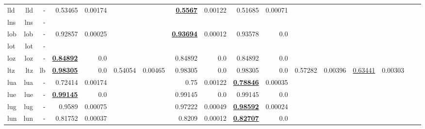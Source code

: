 \documentclass[11pt]{article}
\begin{document}
\begin{table*}[h]
{\begin{tabular}{lrrrrrrrrrrrrrrrr}
lld         & lld         & -         & 0.53465         & 0.00174         &          &          & \textbf{\underline{0.5567}}         & 0.00122         & 0.51685         & 0.00071         &          &          &          &          \\
lns         & lns         & -         &          &          &          &          &          &          &          &          &          &          &          &          \\
lob         & lob         & -         & 0.92857         & 0.00025         &          &          & \textbf{\underline{0.93694}}         & 0.00012         & 0.93578         & 0.0         &          &          &          &          \\
lot         & lot         & -         &          &          &          &          &          &          &          &          &          &          &          &          \\
loz         & loz         & -         & \textbf{\underline{0.84892}}         & 0.0         &          &          & 0.84892         & 0.0         & 0.84892         & 0.0         &          &          &          &          \\
ltz         & ltz         & lb         & \textbf{\underline{0.98305}}         & 0.0         & 0.54054         & 0.00465         & 0.98305         & 0.0         & 0.98305         & 0.0         & 0.57282         & 0.00396         & \underline{0.63441}         & 0.00303         \\
lua         & lua         & -         & 0.72414         & 0.00174         &          &          & 0.75         & 0.00122         & \textbf{\underline{0.78846}}         & 0.00035         &          &          &          &          \\
lue         & lue         & -         & \textbf{\underline{0.99145}}         & 0.0         &          &          & 0.99145         & 0.0         & 0.99145         & 0.0         &          &          &          &          \\
lug         & lug         & -         & 0.9589         & 0.00075         &          &          & 0.97222         & 0.00049         & \textbf{\underline{0.98592}}         & 0.00024         &          &          &          &          \\
lun         & lun         & -         & 0.81752         & 0.00037         &          &          & 0.8209         & 0.00012         & \textbf{\underline{0.82707}}         & 0.0         &          &          &          &          \\

\end{tabular}}
\end{table*}
\end{document}
